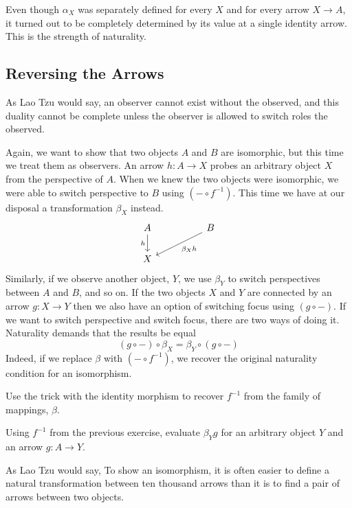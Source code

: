 \documentclass[DaoFP]{subfiles}
\begin{document}
Even though $\alpha_X$ was separately defined for every $X$ and for every arrow $X \to A$, it turned out to be completely determined by its value at a single identity arrow. This is the strength of naturality.
\subsection{Reversing the Arrows}
As Lao Tzu would say, an observer cannot exist without the observed, and this duality cannot be complete unless the observer is allowed to switch roles the observed. 

Again, we want to show that two objects $A$ and $B$ are isomorphic, but this time we treat them as observers. An arrow $h \colon A \to X$ probes an arbitrary object $X$ from the perspective of $A$. When we knew the two objects were isomorphic, we were able to switch perspective to $B$ using $(- \circ f^{-1})$. This time we have at our disposal a transformation $\beta_X$ instead.
\[
 \begin{tikzcd}
 A
 \arrow[d, "h"']
 && B
 \arrow[lld, "\beta_X h"]
 \\
 X
  \end{tikzcd}
\]
Similarly, if we observe another object, $Y$, we use $\beta_Y$ to switch perspectives between $A$ and $B$, and so on. If the two objects $X$ and $Y$ are connected by an arrow $g \colon X \to Y$ then we also have an option of switching focus using $(g \circ -)$. If we want to switch perspective and switch focus, there are two ways of doing it. Naturality demands that the results be equal
\[ (g \circ -) \circ \beta_X = \beta_Y \circ (g \circ -) \]
Indeed, if we replace $\beta$ with $(- \circ f^{-1})$, we recover the original naturality condition for an isomorphism. 

\begin{exercise}
Use the trick with the identity morphism to recover $f^{-1}$ from the family of mappings, $\beta$.
\end{exercise}
\begin{exercise}
Using $f^{-1}$ from the previous exercise, evaluate $\beta_Y g$ for an arbitrary object $Y$ and an arrow $g \colon A \to Y$.
\end{exercise}


As Lao Tzu would say, To show an isomorphism, it is often easier to define a natural transformation between ten thousand arrows than it is to find a pair of arrows between two objects.
\end{document}

